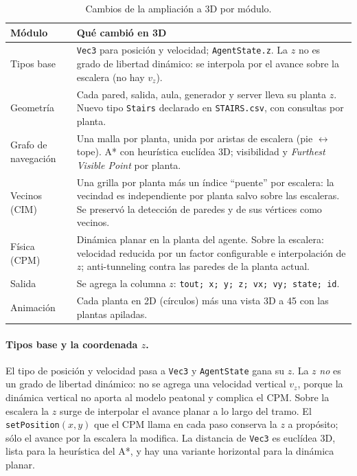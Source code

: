 \documentclass[11pt,a4paper]{article}
\begin{document}
\begin{table}[H]
\centering
\small
\begin{tabular}{@{}p{3.0cm}p{10.4cm}@{}}
\toprule
\textbf{Módulo} & \textbf{Qué cambió en 3D} \\
\midrule
Tipos base & \texttt{Vec3} para posición y velocidad; \texttt{AgentState.z}. La $z$ no es
grado de libertad dinámico: se interpola por el avance sobre la escalera (no hay $v_z$). \\
\addlinespace
Geometría & Cada pared, salida, aula, generador y server lleva su planta $z$. Nuevo tipo
\texttt{Stairs} declarado en \texttt{STAIRS.csv}, con consultas por planta. \\
\addlinespace
Grafo de navegación & Una malla por planta, unida por aristas de escalera (pie
$\leftrightarrow$ tope). A* con heurística euclídea 3D; visibilidad y \emph{Furthest Visible
Point} por planta. \\
\addlinespace
Vecinos (CIM) & Una grilla por planta más un índice ``puente'' por escalera: la vecindad es
independiente por planta salvo sobre las escaleras. Se preservó la detección de paredes y de
sus vértices como vecinos. \\
\addlinespace
Física (CPM) & Dinámica planar en la planta del agente. Sobre la escalera: velocidad reducida
por un factor configurable e interpolación de $z$; anti-tunneling contra las paredes de la
planta actual. \\
\addlinespace
Salida & Se agrega la columna $z$: \texttt{tout; x; y; z; vx; vy; state; id}. \\
\addlinespace
Animación & Cada planta en 2D (círculos) más una vista 3D a 45\textdegree{} con las plantas
apiladas. \\
\bottomrule
\end{tabular}
\caption{Cambios de la ampliación a 3D por módulo.}
\label{tab:modulos}
\end{table}

\paragraph{Tipos base y la coordenada $z$.}
El tipo de posición y velocidad pasa a \texttt{Vec3} y \texttt{AgentState} gana su $z$. La $z$
\emph{no} es un grado de libertad dinámico: no se agrega una velocidad vertical $v_z$, porque la
dinámica vertical no aporta al modelo peatonal y complica el CPM. Sobre la escalera la $z$ surge
de interpolar el avance planar a lo largo del tramo. El \texttt{setPosition}$(x,y)$ que el CPM
llama en cada paso conserva la $z$ a propósito; sólo el avance por la escalera la modifica. La
distancia de \texttt{Vec3} es euclídea 3D, lista para la heurística del A*, y hay una variante
horizontal para la dinámica planar.
\end{document}
